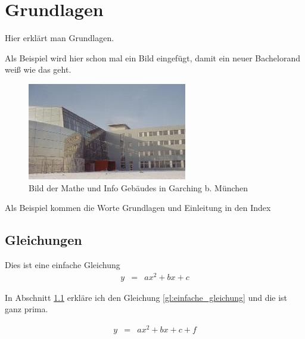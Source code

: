 \chapter{Grundlagen}
Hier erklärt man Grundlagen.

Als Beispiel wird hier schon mal ein Bild eingefügt, damit ein neuer Bachelorand wei\ss{} wie das geht.

\begin{figure}
	\centering
		\includegraphics[width=\textwidth]{bilder/garching.jpg}
	\caption{Bild der Mathe und Info Gebäudes in Garching b. München}
	\label{fig:garching}
\end{figure}

Als Beispiel kommen die Worte Grundlagen und Einleitung in den Index  

%
\section{Gleichungen}\label{sec:gleichungen}
%
Dies ist eine einfache Gleichung
%
\begin{eqnarray}\label{gl:einfache_gleichung}
  y & = & ax^2 + bx + c
\end{eqnarray}

In Abschnitt \ref{sec:gleichungen} erkläre ich den Gleichung \ref{gl:einfache_gleichung} und die ist ganz prima. 


\begin{eqnarray}\label{gl:einfache_gleichung2}
	y & = & ax^2 + bx + c +f
\end{eqnarray}

